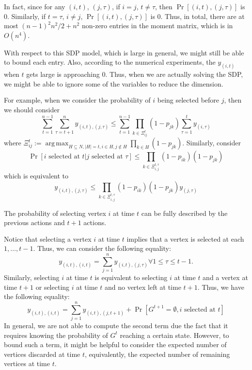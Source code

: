 \documentclass[10pt,leqno]{amsart}
\DeclareMathOperator*{\argmax}{arg\,max}
\begin{document}
In fact, since for any $(i,t)$, $(j,\tau)$, if $i=j$, $t\neq\tau$, then $\Pr[(i,t),(j,\tau)]$ is $0$. Similarly, if $t=\tau$, $i\neq j$, $\Pr[(i,t),(j,\tau)]$ is $0$.
Thus, in total, there are at most $(n-1)^2n^2/2+n^2$ non-zero entries in the moment matrix, which is in $O(n^4)$.

With respect to this SDP model, which is large in general, we might still be able to bound each entry.
Also, according to the numerical experiments, the $y_{(i,t)}$ when $t$ gets large is approaching $0$.
Thus, when we are actually solving the SDP, we might be able to ignore some of the variables to reduce the dimension.

For example, when we consider the probability of $i$ being selected before $j$, then we should consider 
\[\sum_{t=1}^{n-1}\sum_{\tau=t+1}^{n}y_{(i,t),(j,\tau)}\leq \sum_{t=1}^{n-1}\prod_{k\in\Xi_{ij}^{t}}(1-p_{jk})\sum_{\tau=1}^{t}y_{(i,\tau)}\]
where $\Xi_{ij}^{t}:=\argmax_{H\subseteq N, |H|=t, i\in H,j\notin H}\prod_{k\in H}(1-p_{jk})$.
Similarly, consider 
\[\Pr[\text{$i$ selected at $t$}|\text{$j$ selected at $\tau$}]\leq \prod_{k\in \Xi_{i,j}^{t,\tau}}(1-p_{ik})(1-p_{jk})\]
which is equivalent to 
\[y_{(i,t),(j,\tau)}\leq \prod_{k\in \Xi_{i,j}^{t,\tau}}(1-p_{ik})(1-p_{jk})y_{(j,\tau)}\]

The probability of selecting vertex $i$ at time $t$ can be fully described by the previous actions and $t+1$ actions.

Notice that selecting a vertex $i$ at time $t$ implies that a vertex is selected at each $1,\ldots, t-1$. 
Thus, we can consider the following equality:
\[y_{(i,t),(i,t)}=\sum_{j=1}^{n}y_{(i,t),(j,\tau)}\forall 1\leq \tau\leq t-1.\]
Similarly, selecting $i$ at time $t$ is equivalent to selecting $i$ at time $t$ and a vertex at time $t+1$ or selecting $i$ at time $t$ and no vertex left at time $t+1$.
Thus, we have the following equality:
\[y_{(i,t),(i,t)}=\sum_{j=1}^{n}y_{(i,t),(j,t+1)}+\Pr[G^{t+1}=\emptyset,i\text{ selected at }t]\]
In general, we are not able to compute the second term due the fact that it requires knowing the probability of $G^t$ reaching a certain state. 
However, to bound such a term, it might be helpful to consider the expected number of vertices discarded at time $t$, equivalently, the expected number of remaining vertices at time $t$.
\end{document}
